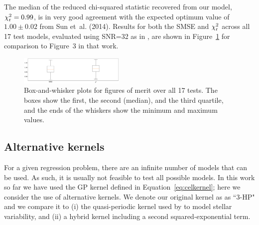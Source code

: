 \documentclass[fleqn,usenatbib]{mnras}
\begin{document}
The median of the reduced chi-squared statistic recovered from our model, $\chi^2_{\rm r} = 0.99$, is in very good agreement with the expected optimum value of $1.00\pm0.02$ from Sun et~al. (2014).
Results for both the SMSE and $\chi_{\rm r}^2$ across all 17 test models, evaluated using SNR=32 as in \cite{Sun_2015}, are shown in Figure~\ref{fig:sunmetrics} for comparison to Figure~3 in that work.
%
\begin{figure}
    \centering
    \includegraphics[width=0.45\textwidth]{./FIGURES/smse.png}
    \caption{Box-and-whisker plots for figures of merit over all 17 tests. The boxes show the first, the second (median), and the third quartile, and the ends of the whiskers show the minimum and maximum values.}
    \label{fig:sunmetrics}
\end{figure}

%
%

\subsection{Alternative kernels}
\label{sec:infocrit}

For a given regression problem, there are an infinite number of models that can be used. As such, it is usually not feasible to test all possible models. In this work so far we have used the GP kernel defined in Equation~\ref{eq:celkernel}; here we consider the use of alternative kernels. We denote our original kernel as as ``3-HP" and we compare it to (i) the quasi-periodic kernel used by \cite{celerite} to model stellar variability, and (ii) a hybrid kernel including a second squared-exponential term.
\end{document}
